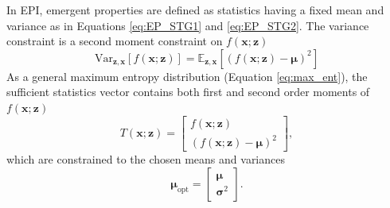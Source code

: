 \documentclass[11pt]{article}
\begin{document}
In EPI, emergent properties are defined as statistics having a fixed mean and variance as in Equations \ref{eq:EP_STG1} and \ref{eq:EP_STG2}.
The variance constraint is a second moment constraint on $f(\mathbf{x}; \mathbf{z})$
 \begin{equation}
\text{Var}_{\mathbf{z},\mathbf{x}}\left[f(\mathbf{x}; \mathbf{z})\right] = \mathbb{E}_{\mathbf{z},\mathbf{x}}\left[\left( f(\mathbf{x}; \mathbf{z}) - \bm{\mu}\right) ^2\right]
\end{equation}
As a general maximum entropy distribution (Equation \ref{eq:max_ent}), the sufficient statistics vector contains both first and second order moments of $f(\mathbf{x}; \mathbf{z})$
\begin{equation} \label{eq:moments}
T(\mathbf{x}; \mathbf{z}) = \begin{bmatrix} f(\mathbf{x}; \mathbf{z}) \\ \left( f(\mathbf{x}; \mathbf{z}) - \bm{\mu} \right)^2 \end{bmatrix},
\end{equation}
which are constrained to the chosen means and variances
\begin{equation} \label{eq:mu_opt}
\bm{\mu}_{\text{opt}} = \begin{bmatrix} \bm{\mu} \\ \bm{\sigma}^2 \end{bmatrix}.
\end{equation}
\end{document}
